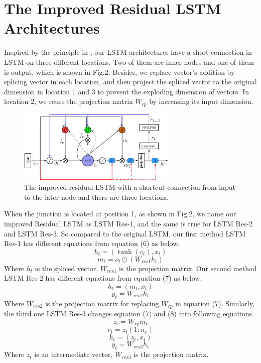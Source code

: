 \documentclass[a4paper]{article}
\begin{document}
\section{The Improved Residual LSTM Architectures}

Inspired by the principle in \cite{residual-lstm}, our LSTM architectures have a short connection in LSTM on three different locations.
Two of them are inner nodes and one of them is output, which is shown in Fig.2. Besides, we replace vector's addition by splicing vector in each location,
and then project the spliced vector to the original dimension in location 1 and 3 to prevent the exploding dimension of vectors.
In location 2, we reuse the projection matrix $W_{rp}$ by increasing its input dimension.
\begin{figure}
\centering
  \includegraphics[width=3.0in]{lstmp.eps}
  \caption{The improved residual LSTM with a shortcut connection from input to the later node and there are three locations.
   }
\end{figure}

When the junction is located at position 1, as shown in Fig.2, we name our improved Residual LSTM as LSTM Res-1, and the same is true for LSTM Res-2 and LSTM Res-3.
So compared to the original LSTM, our first method LSTM Res-1 has different equations from equation (6) as below.
\begin{equation}\label{12}
h_t=(\tanh(c_t), x_t)
\end{equation}
\begin{equation}\label{13}
m_t=o_t\odot (W_{res1}h_t)
\end{equation}
Where $h_t$ is the spliced vector, $W_{res1}$ is the projection matrix. Our second method LSTM Res-2 has different equations from equation (7) as below.
\begin{equation}\label{14}
h_t=(m_t, x_t)
\end{equation}
\begin{equation}\label{15}
y_t=W_{res2}h_t
\end{equation}
Where $W_{res2}$ is the projection matrix for replacing $W_{rp}$ in equation (7). Similarly, the third one LSTM Res-3 changes equation (7) and (8) into following equations.
\begin{equation}\label{16}
z_t=W_{rp}m_t
\end{equation}
\begin{equation}\label{17}
r_t=z_t(1:n_r)
\end{equation}
\begin{equation}\label{18}
h_t=(z_t, x_t)
\end{equation}
\begin{equation}\label{19}
y_t=W_{res3}h_t
\end{equation}
Where $z_t$ is an intermediate vector, $W_{res3}$ is the projection matrix.
\end{document}

